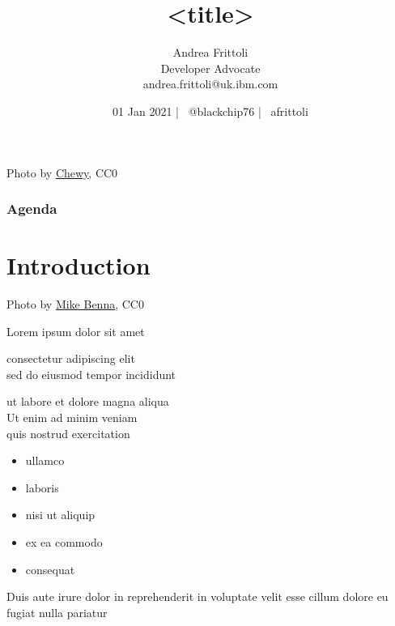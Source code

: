 \documentclass[aspectratio=169,11pt,hyperref={colorlinks=true}]{beamer}
\title{<title>}
\date[01 Jan 2021]{01 Jan 2021 | \faTwitter ~@blackchip76 | \faGithub ~afrittoli}
\author[Andrea Frittoli]{%
  Andrea Frittoli \\
  Developer Advocate \\
  andrea.frittoli@uk.ibm.com \\
}
\begin{document}
\begin{frame}
\titlepage{}
\end{frame}

\begin{lpicrblack}{%
  Photo by \href{https://unsplash.com/@chewy}{\underline{Chewy}}, CC0
  }%
  {%
  \tableofcontents
  }%
  {}
  \frametitle{Agenda}
\end{lpicrblack}

\section[Introduction]{Introduction}

\begin{sectionwithpic}{Photo by \href{https://unsplash.com/@mbenna}{\underline{Mike Benna}}, CC0}
\end{sectionwithpic}

\begin{stripedframe}%
  {%
  Lorem ipsum dolor sit amet
  }%
  {%
  consectetur adipiscing elit \\
  \vspace{0.03\textheight}
  sed do eiusmod tempor incididunt \\
  \vspace{0.1\textheight}
  \centering
  
  }%
  {%
  ut labore et dolore magna aliqua \\
  \vspace{0.03\textheight}
  Ut enim ad minim veniam \\
  \vspace{0.03\textheight}
  quis nostrud exercitation
  }%
  {%
  \begin{itemize}
    \item ullamco
    \item laboris
  \end{itemize}
  \vspace{0.01\textheight}
  \begin{itemize}
    \item nisi ut aliquip
    \item ex ea commodo
    \item consequat
  \end{itemize}
  }%
  {%
  Duis aute irure dolor in reprehenderit in voluptate velit esse cillum dolore eu fugiat nulla pariatur
  }%
\end{stripedframe}
\end{document}
